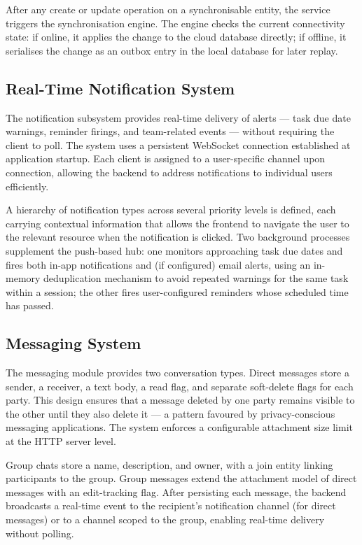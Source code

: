 After any create or update operation on a synchronisable entity, the service
triggers the synchronisation engine. The engine checks the current
connectivity state: if online, it applies the change to the cloud database
directly; if offline, it serialises the change as an outbox entry in the local
database for later replay.

\subsection{Real-Time Notification System}\label{sec:meth_notifications}

The notification subsystem provides real-time delivery of alerts --- task due
date warnings, reminder firings, and team-related events --- without requiring
the client to poll. The system uses a persistent WebSocket connection
established at application startup. Each client is assigned to a user-specific
channel upon connection, allowing the backend to address notifications to
individual users efficiently.

A hierarchy of notification types across several priority levels is defined,
each carrying contextual information that allows the frontend to navigate the
user to the relevant resource when the notification is clicked. Two background
processes supplement the push-based hub: one monitors approaching task due
dates and fires both in-app notifications and (if configured) email alerts,
using an in-memory deduplication mechanism to avoid repeated warnings for the
same task within a session; the other fires user-configured reminders whose
scheduled time has passed.

\subsection{Messaging System}\label{sec:meth_messages}

The messaging module provides two conversation types. Direct messages store a
sender, a receiver, a text body, a read flag, and separate soft-delete flags
for each party. This design ensures that a message deleted by one party remains
visible to the other until they also delete it --- a pattern favoured by
privacy-conscious messaging applications. The system enforces a configurable
attachment size limit at the HTTP server level.

Group chats store a name, description, and owner, with a join entity linking
participants to the group. Group messages extend the attachment model of direct
messages with an edit-tracking flag. After persisting each message, the backend
broadcasts a real-time event to the recipient's notification channel (for
direct messages) or to a channel scoped to the group, enabling real-time
delivery without polling.

